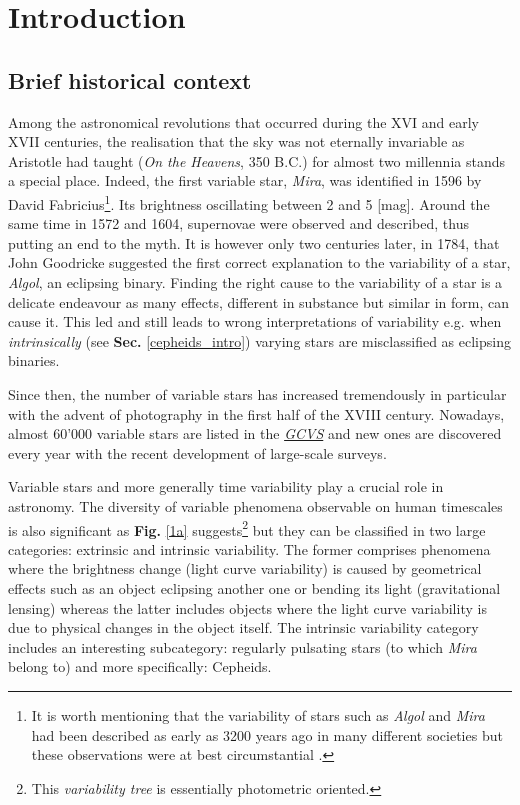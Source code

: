 \chapter{Introduction}
    \section{Brief historical context}
    \label{historical_context}
Among the astronomical revolutions that occurred during the XVI and early XVII centuries, the realisation that the sky was not eternally invariable as Aristotle had taught (\textit{On the Heavens}, 350 B.C.) for almost two millennia stands a special place. Indeed, the first variable star, \textit{Mira}, was identified in 1596 by David Fabricius\footnote{It is worth mentioning that the variability of stars such as \textit{Algol} and \textit{Mira} had been described as early as 3200 years ago in many different societies but these observations were at best circumstantial \parencite{Wilk1995MythologicalStars}.}. Its brightness oscillating between 2 and 5 [mag]. Around the same time in 1572 and 1604, supernovae were observed and described, thus putting an end to the myth. It is however only two centuries later, in 1784, that John Goodricke suggested the first correct explanation to the variability  of a star, \textit{Algol}, an eclipsing binary. Finding the right cause to the variability of a star is a delicate endeavour as many effects, different in substance but similar in form, can cause it. This led and still leads to wrong interpretations of variability e.g. when \textit{intrinsically} (see \textbf{Sec.} \ref{cepheids_intro}) varying stars are misclassified as eclipsing binaries.

\noindent Since then, the number of variable stars has increased tremendously in particular with the advent of photography in the first half of the XVIII century. Nowadays, almost 60'000 variable stars are listed in the \href{https://heasarc.gsfc.nasa.gov/w3browse/all/gcvs.html}{\textit{\ac{GCVS}}} and new ones are discovered every year with the recent development of large-scale surveys\parencite{Eyer2007VariableDiagram}.

\noindent Variable stars and more generally time variability play a crucial role in astronomy. The diversity of variable phenomena observable on human timescales is also significant as \textbf{Fig.} \ref{1a} suggests\footnote{This \textit{variability tree} is essentially photometric oriented.} but they can be classified in two large categories: extrinsic and intrinsic variability. The former comprises phenomena where the brightness change (light curve variability) is caused by geometrical effects such as an object eclipsing another one or bending its light (gravitational lensing) whereas the latter includes objects where the light curve variability is due to physical changes in the object itself. The intrinsic variability category includes an interesting subcategory: regularly pulsating stars (to which \textit{Mira} belong to) and more specifically: Cepheids.

